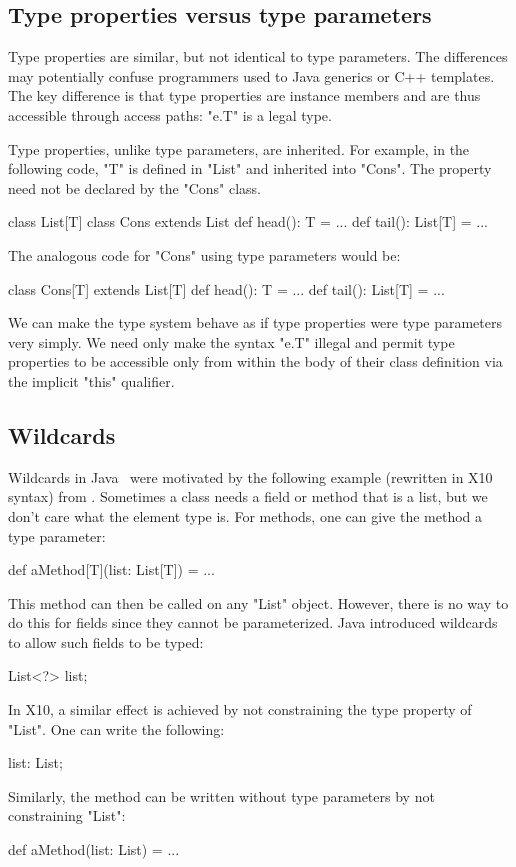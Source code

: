 \documentclass[preprint,nocopyrightspace,9pt]{sigplanconf}
\begin{document}
\subsection{Type properties versus type parameters}

Type properties are similar, but not identical to type parameters.  The
differences may potentially confuse programmers used to Java generics or C++
templates.  The key difference is that type properties are instance members and
are thus accessible through access paths: \xcd"e.T" is a legal type.

Type properties, unlike type parameters, are inherited.
For example, in the following code, \xcd"T" is defined in \xcd"List"
and inherited into \xcd"Cons".  The property need not be
declared by the \xcd"Cons" class.
\begin{xten}
class List[T] { }
class Cons extends List {
    def head(): T = { ... }
    def tail(): List[T] = { ... }
}
\end{xten}
The analogous code for \xcd"Cons" using type parameters would be:
\begin{xten}
class Cons[T] extends List[T] {
    def head(): T = { ... }
    def tail(): List[T] = { ... }
}
\end{xten}

We can make the type system behave as if type properties were
type parameters very simply.  We need only make the syntax \xcd"e.T"
illegal and permit type properties to be accessible only
from within the body of their class definition via the implicit \xcd"this"
qualifier.

\subsection{Wildcards}

Wildcards in Java~\cite{Java3,adding-wildcards} were motivated
by the following example (rewritten in X10 syntax)
from \cite{adding-wildcards}.
Sometimes a class needs a field or method
that is a list, but we don't care what the element type is.
For methods, one can give the method a type parameter:
\begin{xten}
def aMethod[T](list: List[T]) = { ... }
\end{xten}
This method can then be called on any \xcd"List" object.
However, there is no way to do this for fields since they
cannot be parameterized.
Java introduced wildcards to allow such fields to be
typed:
\begin{xten}
List<?> list;
\end{xten}
In X10, a similar effect is achieved by not constraining the
type property of \xcd"List".
One can write the following:
\begin{xten}
list: List;
\end{xten}
Similarly, the method can be written without type parameters by
not constraining \xcd"List":
\begin{xten}
def aMethod(list: List) = { ... }
\end{xten}
\end{document}
